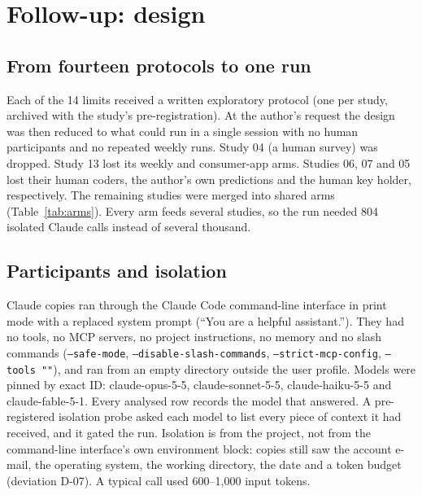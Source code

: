 \documentclass[11pt]{article}
\begin{document}
\section{Follow-up: design}
\label{sec:design}

\subsection{From fourteen protocols to one run}

Each of the 14 limits received a written exploratory protocol (one per study, archived with the study's
pre-registration). At the author's request the design was then reduced to what could run in a single session with no
human participants and no repeated weekly runs. Study 04 (a human survey) was dropped. Study 13 lost its weekly and
consumer-app arms. Studies 06, 07 and 05 lost their human coders, the author's own predictions and the human key
holder, respectively. The remaining studies were merged into shared arms (Table~\ref{tab:arms}). Every arm feeds
several studies, so the run needed 804 isolated Claude calls instead of several thousand.

\begin{table}[h]
\centering

\caption{Arms of the one-go run. ``Copies'' are independent isolated runs. A study listed against an arm uses its data.}
\label{tab:arms}
\end{table}

\subsection{Participants and isolation}

Claude copies ran through the Claude Code command-line interface in print mode with a replaced system prompt
(``You are a helpful assistant.''). They had no tools, no MCP servers, no project instructions, no memory and no
slash commands (\texttt{--safe-mode}, \texttt{--disable-slash-commands}, \texttt{--strict-mcp-config},
\texttt{--tools ""}), and ran from an empty directory outside the user profile. Models were pinned by exact ID:
claude-opus-5-5, claude-sonnet-5-5, claude-haiku-5-5 and claude-fable-5-1. Every analysed row records the model that
answered. A pre-registered isolation probe asked each model to list every piece of context it had received, and it
gated the run. Isolation is from the project, not from the command-line interface's own environment block: copies
still saw the account e-mail, the operating system, the working directory, the date and a token budget
(deviation D-07). A typical call used 600--1{,}000 input tokens.
\end{document}
